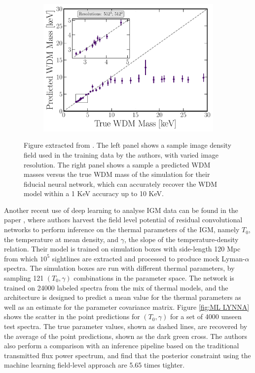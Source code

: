 \begin{figure}
\begin{subfigure}[b]{0.53\textwidth}
    \end{subfigure}
    \hfill
    \begin{subfigure}[b]{0.45\textwidth}
        \centering
        \includegraphics[width=1\textwidth]{img/ML/results_fixed_sim512_res512_z0.pdf}     
    \end{subfigure}
        \caption{Figure extracted from \cite{wdm_from_field}. The left panel shows a sample image density field used in the training data by the authors, with varied image resolution. The right panel shows a sample a predicted WDM masses versus the true WDM mass of the simulation for their fiducial neural network, which can accurately recover the WDM model within a 1 KeV accuracy up to 10 KeV.}
        \label{fig:ML paper wdm field}
\end{figure}

Another recent use of deep learning to analyse IGM data can be found in the paper  \cite{lynna}, where authors harvest the field level potential of residual convolutional networks to perform inference on the thermal parameters of the IGM, namely $T_0$, the temperature at mean density, and $\gamma$, the slope of the temperature-density relation. Their model is trained on simulation boxes with side-length 120 Mpc from which $10^5$ sightlines are extracted and processed to produce mock Lyman-$\alpha$ spectra. The simulation boxes are run with different thermal parameters, by sampling 121 $(T_0,\gamma)$ combinations in the parameter space. The network is trained on 24000 labeled spectra from the mix of thermal models, and the architecture is designed to predict a mean value for the thermal parameters as well as an estimate for the parameter covariance matrix. Figure \ref{fig:ML LYNNA} shows the scatter in the point predictions for $(T_0,\gamma)$ for a set of 4000 unseen test spectra. The true parameter values, shown as dashed lines, are recovered by the average of the point predictions, shown as the dark green cross. The authors also perform a comparison with an inference pipeline based on the traditional transmitted flux power spectrum, and find that the posterior constraint using the machine learning field-level approach are 5.65 times tighter.

